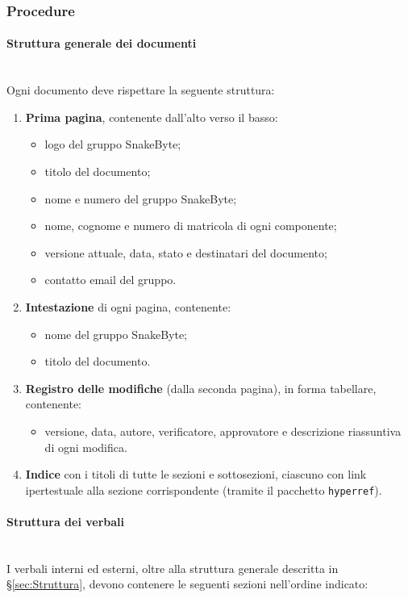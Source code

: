 \documentclass[10pt, letterpaper]{article}
\newcommand{\trisubsection}[1]{\paragraph{#1}\mbox{}\\}
\begin{document}
\subsubsection{Procedure}

\trisubsection{Struttura generale dei documenti}
\label{sec:Struttura}
Ogni documento deve rispettare la seguente struttura:

\begin{enumerate}
    \item \textbf{Prima pagina}, contenente dall'alto verso il basso:
    \begin{itemize}
        \item logo del gruppo SnakeByte;
        \item titolo del documento;
        \item nome e numero del gruppo SnakeByte;
        \item nome, cognome e numero di matricola di ogni componente;
        \item versione attuale, data, stato e destinatari del documento;
        \item contatto email del gruppo.
    \end{itemize}
    \item \textbf{Intestazione} di ogni pagina, contenente:
    \begin{itemize}
        \item nome del gruppo SnakeByte;
        \item titolo del documento.
    \end{itemize}
    \item \textbf{Registro delle modifiche} (dalla seconda pagina), in forma tabellare, contenente:
    \begin{itemize}
        \item versione, data, autore, verificatore, approvatore e descrizione riassuntiva di ogni modifica.
    \end{itemize}
    \item \textbf{Indice} con i titoli di tutte le sezioni e sottosezioni, ciascuno con link ipertestuale alla sezione corrispondente (tramite il pacchetto \texttt{hyperref}).
\end{enumerate}

\trisubsection{Struttura dei verbali}
\label{sec:StrutturaVerbali}
I verbali interni ed esterni, oltre alla struttura generale descritta in §\ref{sec:Struttura}, devono contenere le seguenti sezioni nell'ordine indicato:
\end{document}
